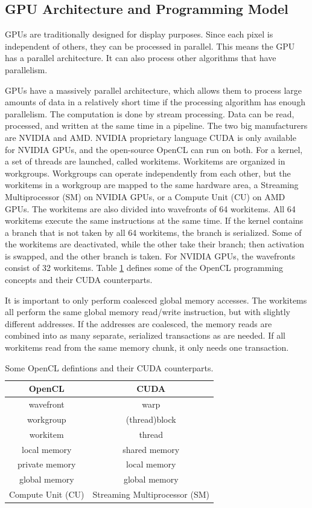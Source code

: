 \subsection {GPU Architecture and Programming Model}
GPUs are traditionally designed for display purposes.
Since each pixel is independent of others, they can be processed in parallel.
This means the GPU has a parallel architecture.
It can also process other algorithms that have parallelism.

GPUs have a massively parallel architecture, which allows them to process large amounts of data in a relatively short time if the processing algorithm has enough parallelism.
The computation is done by stream processing.
Data can be read, processed, and written at the same time in a pipeline.
The two big manufacturers are NVIDIA and AMD.
NVIDIA proprietary language CUDA is only available for NVIDIA GPUs, and the open-source OpenCL can run on both.
For a kernel, a set of threads are launched, called workitems.
Workitems are organized in workgroups.
Workgroups can operate independently from each other, but the workitems in a workgroup are mapped to the same hardware area, a Streaming Multiprocessor (SM) on NVIDIA GPUs, or a Compute Unit (CU) on AMD GPUs.
The workitems are also divided into wavefronts of 64 workitems.
All 64 workitems execute the same instructions at the same time.
If the kernel contains a branch that is not taken by all 64 workitems, the branch is serialized.
Some of the workitems are deactivated, while the other take their branch; then activation is swapped, and the other branch is taken.
For NVIDIA GPUs, the wavefronts consist of 32 workitems.
Table \ref{tab:cuda_opencl_glossary} defines some of the OpenCL programming concepts and their CUDA counterparts.

It is important to only perform coalesced global memory accesses.
The workitems all perform the same global memory read/write instruction, but with slightly different addresses.
If the addresses are coalesced, the memory reads are combined into as many separate, serialized transactions as are needed.
If all workitems read from the same memory chunk, it only needs one transaction.

\begin{table}[h]
\centering
\begin{tabular}{c|c}
OpenCL & CUDA \\ \hline
wavefront & warp \\
workgroup & (thread)block \\
workitem & thread \\
local memory & shared memory \\
private memory & local memory \\
global memory & global memory \\
Compute Unit (CU) & Streaming Multiprocessor (SM)
\end{tabular}
\caption{Some OpenCL defintions and their CUDA counterparts.}
\label{tab:cuda_opencl_glossary}
\end{table}

